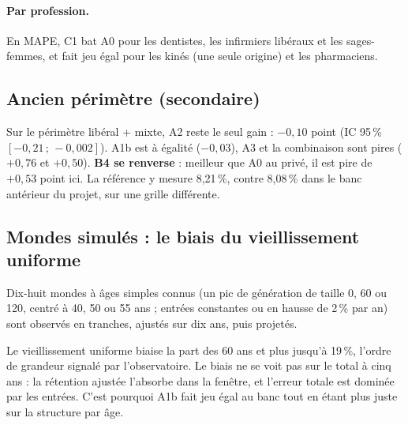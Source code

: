 \paragraph{Par profession.} En MAPE, C1 bat A0 pour les dentistes, les infirmiers libéraux et les
sages-femmes, et fait jeu égal pour les kinés (une seule origine) et les pharmaciens\mesure.

\subsection{Ancien périmètre (secondaire)}
Sur le périmètre libéral + mixte, A2 reste le seul gain : $-0{,}10$\mesure{} point
(IC 95\,\% $[-0{,}21\,;\,-0{,}002]$\mesure). A1b est à égalité ($-0{,}03$\mesure), A3 et la combinaison
sont pires ($+0{,}76$ et $+0{,}50$\mesure). \textbf{B4 se renverse} : meilleur que A0 au privé, il est
pire de $+0{,}53$\mesure{} point ici. La référence y mesure 8,21\,\%\mesure, contre 8,08\,\% dans le banc
antérieur du projet, sur une grille différente.

\subsection{Mondes simulés : le biais du vieillissement uniforme}
Dix-huit mondes à âges simples connus (un pic de génération de taille 0, 60 ou 120, centré à 40, 50 ou
55 ans ; entrées constantes ou en hausse de 2\,\% par an\suppose) sont observés en tranches, ajustés
sur dix ans, puis projetés.
\begin{table}[h]
\centering\small
{}
\caption{Erreurs en \%, mesurées\mesure{} sur mondes simulés.}
\end{table}
Le vieillissement uniforme biaise la part des 60 ans et plus jusqu'à 19\,\%\mesure, l'ordre de grandeur
signalé par l'observatoire. Le biais ne se voit pas sur le total à cinq ans : la rétention ajustée
l'absorbe dans la fenêtre\derive, et l'erreur totale est dominée par les entrées. C'est pourquoi A1b
fait jeu égal au banc tout en étant plus juste sur la structure par âge.

